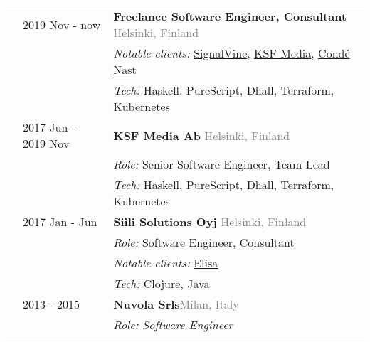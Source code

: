 \documentclass[a4paper,10pt]{article}
\newcommand{\locationRight}[1]{\hfill {\footnotesize \textcolor{gray}{#1}}}
\begin{document}
\noindent
\large
\begin{tabularx}{\textwidth}{ C{0.5cm} L{4.0cm} *{1}{X}}
  & 2019 Nov - now & \textbf{Freelance Software Engineer, Consultant} \locationRight{Helsinki, Finland} \vspace{1 mm}\\
	&			  & \hspace{5mm} {\normalsize \emph{Notable clients:} \href{https://signalvine.com}{SignalVine}, \href{https://ksfmedia.fi}{KSF Media}, \href{https://condenast.com}{Condé Nast} \vspace{0 mm}} \\
	&			  & \hspace{5mm} {\normalsize \emph{Tech:} Haskell, PureScript, Dhall, Terraform, Kubernetes \vspace{4 mm}} \\
  & 2017 Jun - 2019 Nov & \textbf{KSF Media Ab} \locationRight{Helsinki, Finland} \vspace{1 mm}\\
	&			  & \hspace{5mm} {\normalsize \emph{Role:} Senior Software Engineer, Team Lead \vspace{0 mm}} \\
	&			  & \hspace{5mm} {\normalsize \emph{Tech:} Haskell, PureScript, Dhall, Terraform, Kubernetes \vspace{4 mm}} \\
  & 2017 Jan - Jun & \textbf{Siili Solutions Oyj} \locationRight{Helsinki, Finland} \vspace{1 mm}\\
	&			  & \hspace{5mm} {\normalsize \emph{Role:} Software Engineer, Consultant \vspace{0 mm}} \\
	&			  & \hspace{5mm} {\normalsize \emph{Notable clients:} \href{https://elisa.fi}{Elisa} \vspace{0 mm}} \\
	&			  & \hspace{5mm} {\normalsize \emph{Tech:} Clojure, Java \vspace{4mm}} \\
	& 2013 - 2015 & \textbf{Nuvola Srls}\locationRight{Milan, Italy} \vspace{1 mm}\\
	&			  & \hspace{5mm} \emph{\normalsize Role: Software Engineer \vspace{0 mm}}\\

\end{tabularx}
\end{document}
